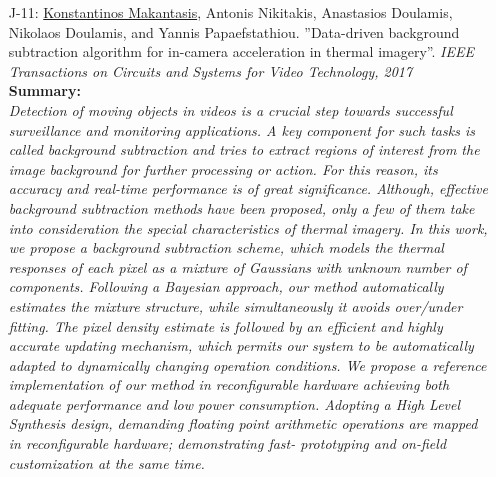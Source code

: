 \documentclass[a4paper,10pt]{article}
\begin{document}
\begin{itemize}
	\item [J-11:]\underline{Konstantinos Makantasis}, Antonis Nikitakis, Anastasios Doulamis, Nikolaos Doulamis, and Yannis Papaefstathiou. ''Data-driven background subtraction algorithm for in-camera acceleration in thermal imagery''. \textit{IEEE Transactions on Circuits and Systems for Video Technology, 2017}\\
	\textbf{Summary:}\\
	\textit{Detection of moving objects in videos is a crucial step towards successful surveillance and monitoring applications. A key component for such tasks is called background subtraction and tries to extract regions of interest from the image background for further processing or action. For this reason, its accuracy and real-time performance is of great significance. Although, effective background subtraction methods have been proposed, only a few of them take into consideration the special characteristics of thermal imagery. In this work, we propose a background subtraction scheme, which models the thermal responses of each pixel as a mixture of Gaussians with unknown number of components. Following a Bayesian approach, our method automatically estimates the mixture structure, while simultaneously it avoids over/under fitting. The pixel density estimate is followed by an efficient and highly accurate updating mechanism, which permits our system to be automatically adapted to dynamically changing operation conditions. We propose a reference implementation of our method in reconfigurable hardware achieving both adequate performance and low power consumption. Adopting a High Level Synthesis design, demanding floating point arithmetic operations are mapped in reconfigurable hardware; demonstrating fast- prototyping and on-field customization at the same time.}
	

\end{itemize}
\end{document}
